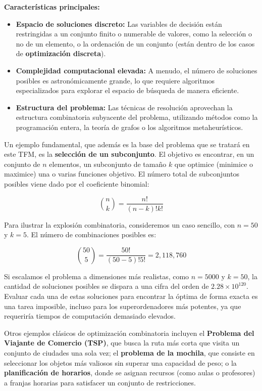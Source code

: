 \documentclass[12pt,a4paper]{book}
\begin{document}
\textbf{Características principales:}
\begin{itemize}
    \item \textbf{Espacio de soluciones discreto:} Las variables de decisión están restringidas a un conjunto finito o numerable de valores, como la selección o no de un elemento, o la ordenación de un conjunto (están dentro de los casos de \textbf{optimización discreta}). 
    \item \textbf{Complejidad computacional elevada:} A menudo, el número de soluciones posibles es astronómicamente grande, lo que requiere algoritmos especializados para explorar el espacio de búsqueda de manera eficiente.
    \item \textbf{Estructura del problema:} Las técnicas de resolución aprovechan la estructura combinatoria subyacente del problema, utilizando métodos como la programación entera, la teoría de grafos o los algoritmos metaheurísticos.
\end{itemize}

Un ejemplo fundamental, que además es la base del problema que se tratará en este TFM, es la \textbf{selección de un subconjunto}. El objetivo es encontrar, en un conjunto de $n$ elementos, un subconjunto de tamaño $k$ que optimice (minimice o maximice) una o varias funciones objetivo. El número total de subconjuntos posibles viene dado por el coeficiente binomial:

$$
    \binom{n}{k} = \frac{n!}{(n-k)!k!}
$$

Para ilustrar la explosión combinatoria, consideremos un caso sencillo, con $n=50$ y $k=5$. El número de combinaciones posibles es:

$$
    \binom{50}{5} = \frac{50!}{(50-5)!5!} = 2,118,760
$$

Si escalamos el problema a dimensiones más realistas, como $n=5000$ y $k=50$, la cantidad de soluciones posibles se dispara a una cifra del orden de $2.28 \times 10^{120}$. Evaluar cada una de estas soluciones para encontrar la óptima de forma exacta es una tarea imposible, incluso para los superordenadores más potentes, ya que requeriría tiempos de computación demasiado elevados.

Otros ejemplos clásicos de optimización combinatoria incluyen el \textbf{Problema del Viajante de Comercio (TSP)}, que busca la ruta más corta que visita un conjunto de ciudades una sola vez; el \textbf{problema de la mochila}, que consiste en seleccionar los objetos más valiosos sin superar una capacidad de peso; o la \textbf{planificación de horarios}, donde se asignan recursos (como aulas o profesores) a franjas horarias para satisfacer un conjunto de restricciones.
\end{document}
